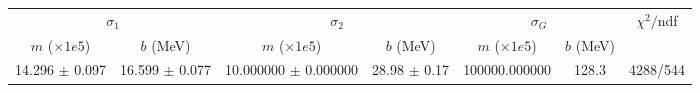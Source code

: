 \begin{tabular}{cc|cc|cc||c}
\multicolumn{2}{c|}{$\sigma_1$} & \multicolumn{2}{|c}{$\sigma_2$} & \multicolumn{2}{|c}{$\sigma_G$}  & \multirow{2}{*}{$\chi^2/$ndf}\\
$m$ ($\times1e5$) & $b$ (MeV) & $m$ ($\times1e5$) & $b$ (MeV) & $m$ ($\times1e5$) & $b$ (MeV) & \\
\hline
14.296 $\pm$ 0.097 & 16.599 $\pm$ 0.077 & 10.000000 $\pm$ 0.000000 & 28.98 $\pm$ 0.17 & 100000.000000 & 128.3 & 4288/544\\
\end{tabular}
